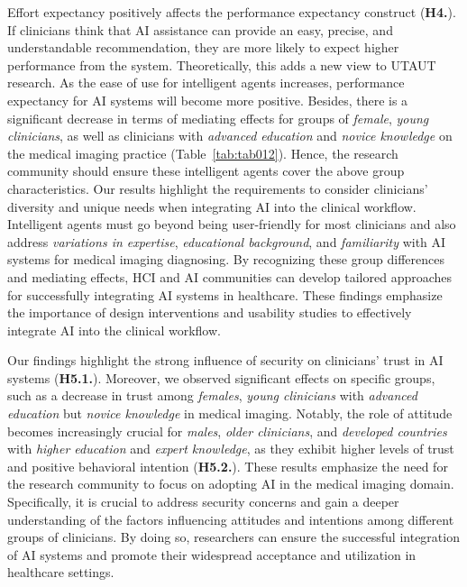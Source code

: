 Effort expectancy positively affects the performance expectancy construct ({\bf H4.}).
If clinicians think that \ac{AI} assistance can provide an easy, precise, and understandable recommendation, they are more likely to expect higher performance from the system.
Theoretically, this adds a new view to \ac{UTAUT} research.
As the ease of use for intelligent agents increases, performance expectancy for \ac{AI} systems will become more positive.
Besides, there is a significant decrease in terms of mediating effects for groups of {\it female}, {\it young clinicians}, as well as clinicians with {\it advanced education} and {\it novice knowledge} on the medical imaging practice (Table~\ref{tab:tab012}).
Hence, the research community should ensure these intelligent agents cover the above group characteristics.
Our results highlight the requirements to consider clinicians' diversity and unique needs when integrating \ac{AI} into the clinical workflow.
Intelligent agents must go beyond being user-friendly for most clinicians and also address {\it variations in expertise}, {\it educational background}, and {\it familiarity} with \ac{AI} systems for medical imaging diagnosing.
By recognizing these group differences and mediating effects, \ac{HCI} and \ac{AI} communities can develop tailored approaches for successfully integrating \ac{AI} systems in healthcare.
These findings emphasize the importance of design interventions and usability studies to effectively integrate \ac{AI} into the clinical workflow.

Our findings highlight the strong influence of security on clinicians' trust in \ac{AI} systems ({\bf H5.1.}).
Moreover, we observed significant effects on specific groups, such as a decrease in trust among {\it females}, {\it young clinicians} with {\it advanced education} but {\it novice knowledge} in medical imaging.
Notably, the role of attitude becomes increasingly crucial for {\it males}, {\it older clinicians}, and {\it developed countries} with {\it higher education} and {\it expert knowledge}, as they exhibit higher levels of trust and positive behavioral intention ({\bf H5.2.}).
These results emphasize the need for the research community to focus on adopting \ac{AI} in the medical imaging domain.
Specifically, it is crucial to address security concerns and gain a deeper understanding of the factors influencing attitudes and intentions among different groups of clinicians.
By doing so, researchers can ensure the successful integration of \ac{AI} systems and promote their widespread acceptance and utilization in healthcare settings.

